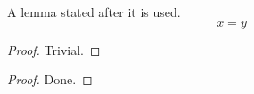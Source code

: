 \begin{lemma}\label{later}\label{later-alias}
  A lemma stated after it is used.
  \begin{equation}x = y\end{equation}
\end{lemma}
\begin{proof} Trivial. \end{proof}

\begin{theorem}[Main]\label{main}\mathlibok
\end{theorem}
\begin{proof} Done. \end{proof}
